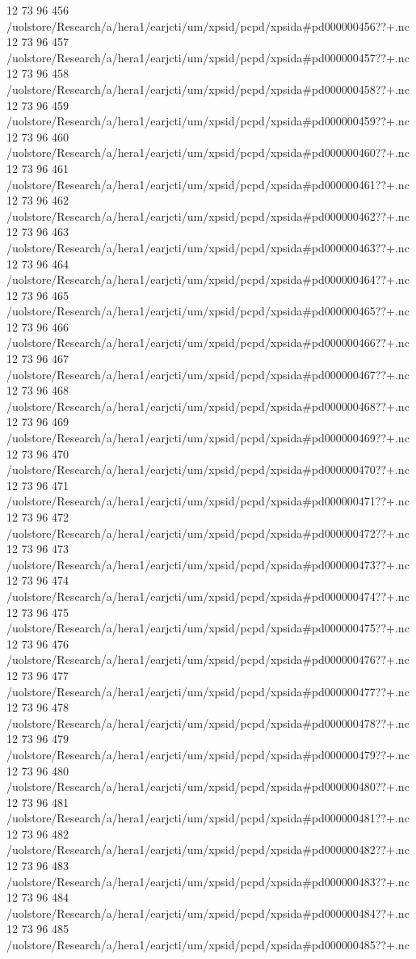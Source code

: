 12 73 96
456
/uolstore/Research/a/hera1/earjcti/um/xpsid/pcpd/xpsida#pd000000456??+.nc
12 73 96
457
/uolstore/Research/a/hera1/earjcti/um/xpsid/pcpd/xpsida#pd000000457??+.nc
12 73 96
458
/uolstore/Research/a/hera1/earjcti/um/xpsid/pcpd/xpsida#pd000000458??+.nc
12 73 96
459
/uolstore/Research/a/hera1/earjcti/um/xpsid/pcpd/xpsida#pd000000459??+.nc
12 73 96
460
/uolstore/Research/a/hera1/earjcti/um/xpsid/pcpd/xpsida#pd000000460??+.nc
12 73 96
461
/uolstore/Research/a/hera1/earjcti/um/xpsid/pcpd/xpsida#pd000000461??+.nc
12 73 96
462
/uolstore/Research/a/hera1/earjcti/um/xpsid/pcpd/xpsida#pd000000462??+.nc
12 73 96
463
/uolstore/Research/a/hera1/earjcti/um/xpsid/pcpd/xpsida#pd000000463??+.nc
12 73 96
464
/uolstore/Research/a/hera1/earjcti/um/xpsid/pcpd/xpsida#pd000000464??+.nc
12 73 96
465
/uolstore/Research/a/hera1/earjcti/um/xpsid/pcpd/xpsida#pd000000465??+.nc
12 73 96
466
/uolstore/Research/a/hera1/earjcti/um/xpsid/pcpd/xpsida#pd000000466??+.nc
12 73 96
467
/uolstore/Research/a/hera1/earjcti/um/xpsid/pcpd/xpsida#pd000000467??+.nc
12 73 96
468
/uolstore/Research/a/hera1/earjcti/um/xpsid/pcpd/xpsida#pd000000468??+.nc
12 73 96
469
/uolstore/Research/a/hera1/earjcti/um/xpsid/pcpd/xpsida#pd000000469??+.nc
12 73 96
470
/uolstore/Research/a/hera1/earjcti/um/xpsid/pcpd/xpsida#pd000000470??+.nc
12 73 96
471
/uolstore/Research/a/hera1/earjcti/um/xpsid/pcpd/xpsida#pd000000471??+.nc
12 73 96
472
/uolstore/Research/a/hera1/earjcti/um/xpsid/pcpd/xpsida#pd000000472??+.nc
12 73 96
473
/uolstore/Research/a/hera1/earjcti/um/xpsid/pcpd/xpsida#pd000000473??+.nc
12 73 96
474
/uolstore/Research/a/hera1/earjcti/um/xpsid/pcpd/xpsida#pd000000474??+.nc
12 73 96
475
/uolstore/Research/a/hera1/earjcti/um/xpsid/pcpd/xpsida#pd000000475??+.nc
12 73 96
476
/uolstore/Research/a/hera1/earjcti/um/xpsid/pcpd/xpsida#pd000000476??+.nc
12 73 96
477
/uolstore/Research/a/hera1/earjcti/um/xpsid/pcpd/xpsida#pd000000477??+.nc
12 73 96
478
/uolstore/Research/a/hera1/earjcti/um/xpsid/pcpd/xpsida#pd000000478??+.nc
12 73 96
479
/uolstore/Research/a/hera1/earjcti/um/xpsid/pcpd/xpsida#pd000000479??+.nc
12 73 96
480
/uolstore/Research/a/hera1/earjcti/um/xpsid/pcpd/xpsida#pd000000480??+.nc
12 73 96
481
/uolstore/Research/a/hera1/earjcti/um/xpsid/pcpd/xpsida#pd000000481??+.nc
12 73 96
482
/uolstore/Research/a/hera1/earjcti/um/xpsid/pcpd/xpsida#pd000000482??+.nc
12 73 96
483
/uolstore/Research/a/hera1/earjcti/um/xpsid/pcpd/xpsida#pd000000483??+.nc
12 73 96
484
/uolstore/Research/a/hera1/earjcti/um/xpsid/pcpd/xpsida#pd000000484??+.nc
12 73 96
485
/uolstore/Research/a/hera1/earjcti/um/xpsid/pcpd/xpsida#pd000000485??+.nc
